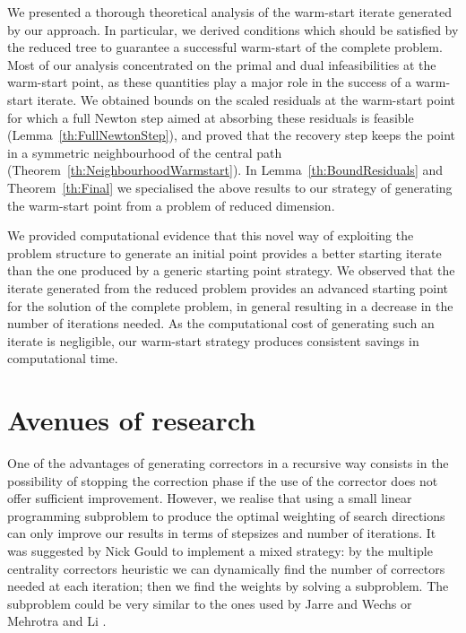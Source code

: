 We presented a thorough theoretical analysis of the warm-start
iterate generated by our approach.
In particular, we derived conditions 
which should be satisfied by the reduced tree to guarantee a successful 
warm-start of the complete problem. 
Most of our analysis concentrated on the primal and dual infeasibilities
at the warm-start point, as these quantities play a major role in the
success of a warm-start iterate.
We obtained bounds on the scaled residuals at the warm-start point
for which a full Newton step aimed at absorbing these residuals
is feasible (Lemma~\ref{th:FullNewtonStep}), and
proved that the recovery step keeps the point in a
symmetric neighbourhood of the central path
(Theorem~\ref{th:NeighbourhoodWarmstart}).
In Lemma~\ref{th:BoundResiduals} and Theorem~\ref{th:Final} we specialised
the above results to our strategy of generating the warm-start
point from a problem of reduced dimension.

We provided computational evidence that this novel way 
of exploiting the problem structure to generate an initial point 
provides a better starting iterate than the one produced by a generic 
starting point strategy.
We observed that the iterate generated from the reduced problem
provides an advanced starting point for the solution of the complete problem,
in general resulting in a decrease in the number of iterations needed.
As the computational cost of generating such an iterate is negligible,
our warm-start strategy produces consistent savings in computational time.


%
%
\section{Avenues of research}

One of the advantages of generating correctors in a recursive way
consists in the possibility of stopping the correction phase
if the use of the corrector does not offer sufficient improvement.
However, we realise that using a small linear programming subproblem
to produce the optimal weighting of search directions can only improve
our results in terms of stepsizes and number of iterations.
It was suggested by Nick Gould to implement a mixed strategy:
by the multiple centrality correctors heuristic we can dynamically
find the number of correctors needed at each iteration; then we find
the weights by solving a subproblem.
The subproblem could be very similar to the ones used by
Jarre and Wechs \cite{JarreWechs} or Mehrotra and Li \cite{MehrotraLi}.


